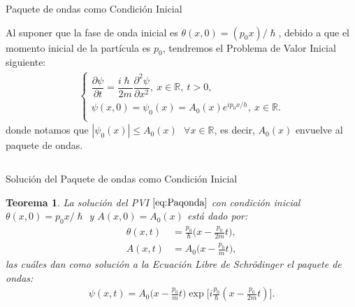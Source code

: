 \documentclass[aspectratio=1610]{beamer}
\newcommand*{\field}[1]{\mathbb{#1}}
\newtheorem*{teo}{Teorema}
\begin{document}
\begin{frame}{Paquete de ondas como Condición Inicial}
   
Al suponer que la fase de onda inicial es $\theta(x,0) = (p_{0}x) / \hslash$, debido a que el momento inicial de la partícula es $p_{0}$, tendremos el Problema de Valor Inicial siguiente: 
\begin{align}
         \left\{ \begin{array}{ll}
         \dfrac{\partial\psi}{\partial t} = \dfrac{i\hslash}{2m}\dfrac{\partial^2\psi}{\partial x^2} , \:x\in\field{R}, \:t>0,\\
         \psi(x,0) = \psi_{0}(x) = A_{0}(x)e^{ip_{0}x/h}, \:x\in\field{R}. \\
         \end{array} \label{eq:Paqonda}
\right.
    \end{align}
donde notamos que $|\psi_{0}(x)|\leq A_{0}(x)\:\:\: \forall x\in\field{R}$, es decir, $A_{0}(x)$ envuelve al paquete de ondas.
    
\begin{columns}
\column{37em}
\end{columns}
\end{frame}

\begin{frame}{Solución del Paquete de ondas como Condición Inicial}
   
\begin{teo}
    La solución del PVI $\eqref{eq:Paqonda}$ con condición inicial $\theta(x,0) = p_{0}x/\hslash$ y $A(x,0) = A_{0}(x)$ está dado por:
    \begin{align*}
        \theta(x,t) & = \frac{p_{0}}{\hslash}\bigg(x - \frac{p_{0}}{2m}t\bigg),
        \\
        A(x,t) & = A_{0}\bigg(x-\frac{p_{0}}{m}t\bigg),
    \end{align*}
    las cuáles dan como solución a la Ecuación Libre de Schrödinger el paquete de ondas:
    \begin{align}
        \psi(x,t) = A_{0}\bigg(x-\frac{p_{0}}{m}t\bigg)\exp\bigg[i\frac{p_{0}}{\hslash}(x - \frac{p_{0}}{2m}t)\bigg].
        \label{eq:Apoyo7}
    \end{align}
\end{teo}
    
\begin{columns}
\column{37em}
\end{columns}
\end{frame}
\end{document}
